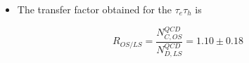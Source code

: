 \documentclass[8pt,xcolor=dvipsnames,xcolor=table]{beamer}
\begin{document}
\begin{frame}
\begin{columns}
\begin{column}{.50\textwidth}
\centering
{}

\begin{itemize}


\item The transfer factor obtained for the $\tau_e\tau_h$ is
\end{itemize}
\begin{equation*}

R_{OS/LS}=
\frac{N_{C,OS}^{QCD}}{N_{D,LS}^{QCD}}
=1.10\pm 0.18
\end{equation*}   

    \end{column}
  \end{columns}


\end{frame}
\end{document}
